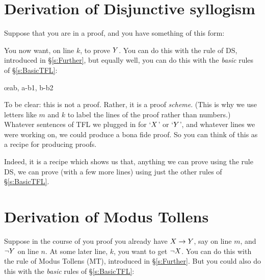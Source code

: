 \section{Derivation of Disjunctive syllogism}
Suppose that you are in a proof, and you have something of this form:
\begin{pf}
\end{pf}
You now want, on line $k$, to prove $Y$. You can do this with the rule of DS, introduced in \S\ref{s:Further}, but equally well, you can do this with the \emph{basic} rules of \S\ref{s:BasicTFL}:
	\begin{pf}
		\open
			\open
			\close
		\close
		\open
		\close
	\oe{ab, a-b1, b-b2}
\end{pf}

To be clear: this is not a proof. Rather, it is a proof \emph{scheme}.
(This is why we use letters like $m$ and $k$ to label the lines of the proof rather than numbers.)
Whatever sentences of TFL we plugged in for `$X$' or `$Y$', and whatever lines we were working on, we could produce a bona fide proof. So you can think of this as a recipe for producing proofs.

Indeed, it is a recipe which shows us that, anything we can prove using the rule DS, we can prove (with a few more lines) using just the other rules of \S\ref{s:BasicTFL}.
%

\section{Derivation of Modus Tollens}
Suppose in the course of you proof you already have $X\rightarrow Y$, say on line $m$, and $\neg Y$ on line $n$. At some later line, $k$, you want to get $\neg X$.
 You can do this with the rule of Modus Tollens (MT), introduced in \S\ref{s:Further}. But you could also do this with the \emph{basic} rules of \S\ref{s:BasicTFL}:

